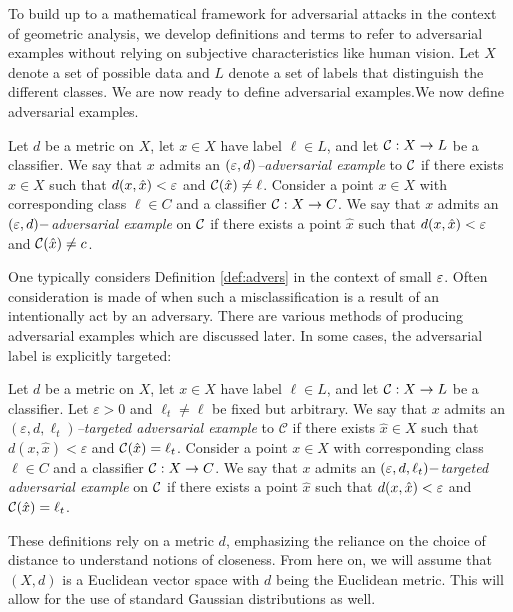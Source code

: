 To build up to a mathematical framework for adversarial attacks in the
context of geometric analysis, we develop definitions and terms to
refer to adversarial examples without relying on subjective
characteristics like human vision. Let $X$ denote a set of possible
data and $L$ denote a set of labels that distinguish the different
classes. We are now ready to define adversarial examples.We now define
adversarial examples. 

\begin{definition} \label{def:advers}
Let $d$ be a metric on $X$, let $x\in X$ have label $\ell\in L$, and let $\mathcal{C}:X\to L$ be a classifier.  We say that $x$ admits an \emph{$(\varepsilon,d)$--adversarial example} to $\mathcal{C}$ if there exists $\hat x \in X$ such that $d(x,\hat x) < \varepsilon$ and $\mathcal{C}(\hat x) \neq \ell$.
Consider a point $x \in X$ with corresponding class $\ell \in C$ and a classifier $\mathcal{C}: X \to C$. We say that $x$ admits an \emph{$(\varepsilon,d)-$adversarial example} on $\mathcal{C}$ if there exists a point $\hat x$ such that $d(x,\hat x) < \varepsilon$ and $\mathcal{C}(\hat x) \neq c$. 
\end{definition}

One typically considers Definition \ref{def:advers} in the context of small $\varepsilon$. 
Often consideration is made of when such a misclassification is a result of an intentionally act by an adversary. 
There are various methods of producing adversarial examples which are discussed later. In some cases, the adversarial label is explicitly targeted:
\begin{definition}
Let $d$ be a metric on $X$, let $x\in X$ have label $\ell\in L$, and let $\mathcal{C}:X\to L$ be a classifier.  Let $\varepsilon>0$ and $\ell_t\neq \ell$ be fixed but arbitrary. We say that $x$ admits an \emph{$(\varepsilon,d,\ell_t)$--targeted adversarial example} to $\mathcal{C}$ if there exists $\hat{x}\in X$ such that $d(x,\hat{x})<\varepsilon$ and $\mathcal{C}(\hat{x})=\ell_t$.
Consider a point $x \in X$ with corresponding class $\ell \in C$ and a classifier $\mathcal{C}: X \to C$. We say that $x$ admits an \emph{$(\varepsilon,d,\ell_t)-$targeted adversarial example} on $\mathcal{C}$ if there exists a point $\hat x$ such that $d(x,\hat x) < \varepsilon$ and $\mathcal{C}(\hat x) = \ell_t$. 
\end{definition}

These definitions rely on a metric $d$, emphasizing the reliance on the choice of distance to understand notions of closeness. From here on, we will assume that $(X,d)$ is a Euclidean vector space with $d$ being the Euclidean metric. This will allow for the use of standard Gaussian distributions as well.%


